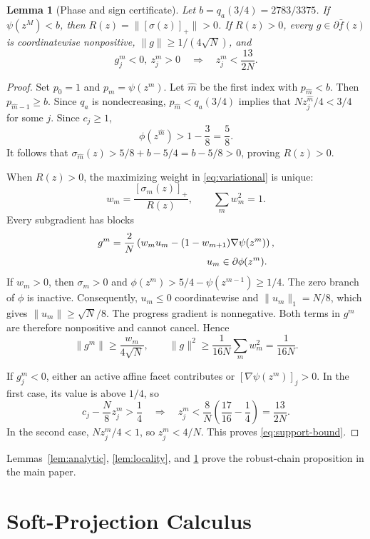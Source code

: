 \documentclass[twoside]{article}
\newtheorem{lemma}[theorem]{Lemma}
\begin{document}
\begin{lemma}[Phase and sign certificate]
\label{lem:phase}
Let $b=q_a(3/4)=2783/3375$. If $\psi(z^M)<b$, then
$R(z)=\|[\sigma(z)]_+\|>0$. If $R(z)>0$, every
$g\in\partial\bar f(z)$ is coordinatewise nonpositive,
$\|g\|\geq1/(4\sqrt N)$, and
\[
 g^m_j<0,\ z^m_j>0\quad\Longrightarrow\quad z^m_j<\frac{13}{2N}.
 \label{eq:support-bound}
\]
\end{lemma}

\begin{proof}
Set $p_0=1$ and $p_m=\psi(z^m)$. Let $\widehat m$ be the first index with
$p_{\widehat m}<b$. Then $p_{\widehat m-1}\geq b$. Since $q_a$ is
nondecreasing, $p_{\widehat m}<q_a(3/4)$ implies that
$Nz^{\widehat m}_j/4<3/4$ for some $j$. Since $c_j\geq1$,
\[
 \phi(z^{\widehat m})>1-\frac38=\frac58.
\]
It follows that
$\sigma_{\widehat m}(z)>5/8+b-5/4=b-5/8>0$, proving $R(z)>0$.

When $R(z)>0$, the maximizing weight in \eqref{eq:variational} is unique:
\[
 w_m=\frac{[\sigma_m(z)]_+}{R(z)},\qquad \sum_mw_m^2=1.
\]
Every subgradient has blocks
\begin{align*}
 g^m&=\frac2N\left(w_mu_m
 -(1-w_{m+1})\nabla\psi(z^m)\right),\\
 &\hspace{34mm}u_m\in\partial\phi(z^m).
\end{align*}
If $w_m>0$, then $\sigma_m>0$ and
$\phi(z^m)>5/4-\psi(z^{m-1})\geq1/4$. The zero branch of $\phi$ is
inactive. Consequently, $u_m\leq0$ coordinatewise and
$\|u_m\|_1=N/8$, which gives $\|u_m\|\geq\sqrt N/8$.
The progress gradient is nonnegative. Both terms in $g^m$ are therefore
nonpositive and cannot cancel. Hence
\[
 \|g^m\|\geq\frac{w_m}{4\sqrt N},\qquad
 \|g\|^2\geq\frac1{16N}\sum_mw_m^2=\frac1{16N}.
\]

If $g^m_j<0$, either an active affine facet contributes or
$[\nabla\psi(z^m)]_j>0$. In the first case, its value is above $1/4$, so
\[
 c_j-\frac N8z^m_j>\frac14
 \quad\Longrightarrow\quad
 z^m_j<\frac8N\left(\frac{17}{16}-\frac14\right)
 =\frac{13}{2N}.
\]
In the second case, $Nz^m_j/4<1$, so $z^m_j<4/N$. This proves
\eqref{eq:support-bound}.
\end{proof}

Lemmas~\ref{lem:analytic}, \ref{lem:locality}, and \ref{lem:phase} prove
the robust-chain proposition in the main paper.

\section{Soft-Projection Calculus}
\label{app:wrapper}
\end{document}
